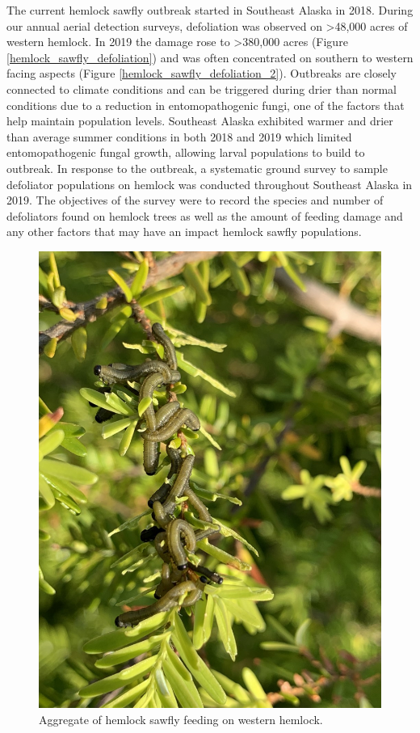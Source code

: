 The current hemlock sawfly outbreak started in Southeast Alaska in 2018.  During our annual aerial detection surveys, defoliation was observed on >48,000 acres of western hemlock.  In 2019 the damage rose to >380,000 acres (Figure \ref{hemlock_sawfly_defoliation}) and was often concentrated on southern to western facing aspects (Figure \ref{hemlock_sawfly_defoliation_2}). Outbreaks are closely connected to climate conditions and can be triggered during drier than normal conditions due to a reduction in entomopathogenic fungi, one of the factors that help maintain population levels.   Southeast Alaska exhibited warmer and drier than average summer conditions in both 2018 and 2019 which limited entomopathogenic fungal growth, allowing larval populations to build to outbreak. In response to the outbreak, a systematic ground survey to sample defoliator populations on hemlock was conducted throughout Southeast Alaska in 2019.  The objectives of the survey were to record the species and number of defoliators found on hemlock trees as well as the amount of feeding damage and any other factors that may have an impact hemlock sawfly populations.

\begin{figure}[H]
\begin{center}
\vspace{2mm}
\includegraphics[width=\textwidth]{img/hemlock_sawfly_larvae.jpg}
\caption{Aggregate of hemlock sawfly feeding on western hemlock.}
\label{hemlock_sawfly_larvae}
\end{center}
\end{figure}

